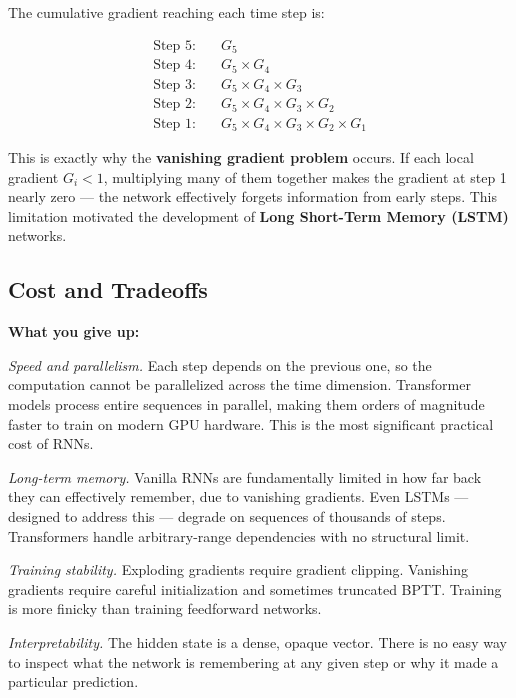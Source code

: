 The cumulative gradient reaching each time step is:

\begin{align}
\text{Step 5:} & \quad G_5 \\
\text{Step 4:} & \quad G_5 \times G_4 \\
\text{Step 3:} & \quad G_5 \times G_4 \times G_3 \\
\text{Step 2:} & \quad G_5 \times G_4 \times G_3 \times G_2 \\
\text{Step 1:} & \quad G_5 \times G_4 \times G_3 \times G_2 \times G_1
\end{align}

This is exactly why the \textbf{vanishing gradient problem} occurs. If each local
gradient $G_i < 1$, multiplying many of them together makes the gradient at step 1
nearly zero --- the network effectively forgets information from early steps. This
limitation motivated the development of \textbf{Long Short-Term Memory (LSTM)} networks.

\subsection{Cost and Tradeoffs}

\textbf{What you give up:}

\medskip
\noindent\textit{Speed and parallelism.}
Each step depends on the previous one, so the computation cannot be parallelized across
the time dimension. Transformer models process entire sequences in parallel, making them
orders of magnitude faster to train on modern GPU hardware. This is the most significant
practical cost of RNNs.

\medskip
\noindent\textit{Long-term memory.}
Vanilla RNNs are fundamentally limited in how far back they can effectively remember,
due to vanishing gradients. Even LSTMs --- designed to address this --- degrade on
sequences of thousands of steps. Transformers handle arbitrary-range dependencies with
no structural limit.

\medskip
\noindent\textit{Training stability.}
Exploding gradients require gradient clipping. Vanishing gradients require careful
initialization and sometimes truncated BPTT. Training is more finicky than training
feedforward networks.

\medskip
\noindent\textit{Interpretability.}
The hidden state is a dense, opaque vector. There is no easy way to inspect what the
network is remembering at any given step or why it made a particular prediction.

